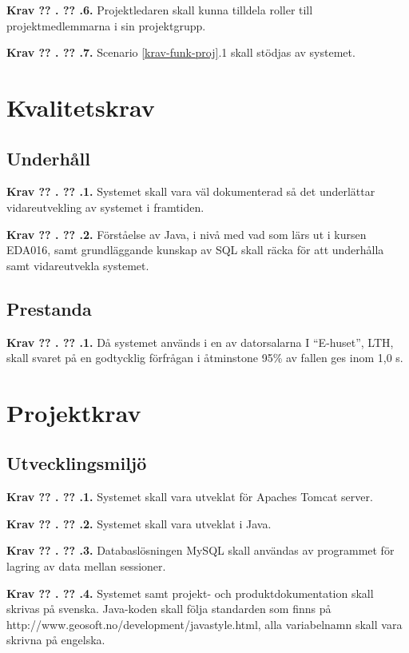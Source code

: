 \documentclass[a4paper]{article}
\newcommand\getcurrentref[1]{%
 \ifnumequal{\value{#1}}{0}
  {??}
  {\the\value{#1}}%
}
\newcommand\requirement[2]{
	\numberedrow{Krav}{#1}{#2}
}
\newcommand\numberedrow[3]{
	\noindent
	\textbf{#1 \getcurrentref{section}.\getcurrentref{subsection}.#2.} #3
	
}
\begin{document}

\requirement{6}{Projektledaren skall kunna tilldela roller till projektmedlemmarna i sin projektgrupp.}
\requirement{7}{Scenario \ref{krav-funk-proj}.1 skall stödjas av systemet.}

\section{Kvalitetskrav}
\subsection{Underhåll}
\requirement{1}{Systemet skall vara väl dokumenterad så det underlättar vidareutvekling av systemet i framtiden.}
\requirement{2}{Förståelse av Java, i nivå med vad som lärs ut i kursen EDA016, samt grundläggande kunskap av SQL skall räcka för att underhålla samt vidareutvekla systemet.}
\subsection{Prestanda}
\requirement{1}{Då systemet används i en av datorsalarna I ``E-huset'', LTH, skall svaret på en godtycklig förfrågan i åtminstone 95\% av fallen ges inom 1,0 s.}
\section{Projektkrav}
\subsection{Utvecklingsmiljö}
\requirement{1}{Systemet skall vara utveklat för Apaches Tomcat server.}
\requirement{2}{Systemet skall vara utveklat i Java.}
\requirement{3}{Databaslösningen MySQL skall användas av programmet för lagring av data mellan sessioner.}
\requirement{4}{Systemet samt projekt- och produktdokumentation skall skrivas på svenska. Java-koden skall följa standarden som finns på http://www.geosoft.no/development/javastyle.html, alla variabelnamn skall vara skrivna på engelska.}
\end{document}
